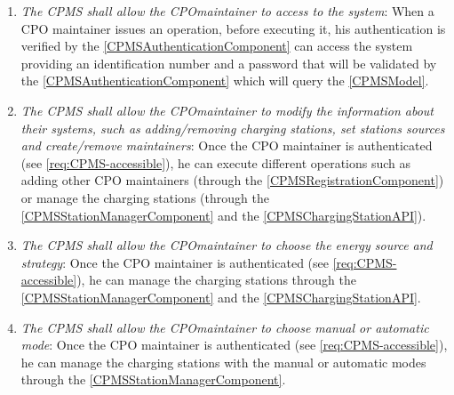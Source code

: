 \begin{enumerate}[label=\textbf{R\arabic*}]
    \label{req:CPMS-reachable}
    \item \textit{The \ac{CPMS} shall allow the \ac{CPO}maintainer to access to the system}:
    When a \ac{CPO} maintainer issues an operation, before executing it, his authentication is verified by the \ref{CPMSAuthenticationComponent} can access the system providing an identification number and a password that will be validated by the \ref{CPMSAuthenticationComponent} which will query the \ref{CPMSModel}.
    \label{req:CPMS-accessible}
    \item \textit{The \ac{CPMS} shall allow the \ac{CPO}maintainer to modify the information about their systems, such as adding/removing charging stations, set stations sources and create/remove maintainers}:
    Once the \ac{CPO} maintainer is authenticated (see \ref{req:CPMS-accessible}), he can execute different operations such as adding other \ac{CPO} maintainers (through the \ref{CPMSRegistrationComponent}) or manage the charging stations (through the \ref{CPMSStationManagerComponent} and the \ref{CPMSChargingStationAPI}).
    \label{req:CPMS-modify-cpo-infos}
    \item \textit{The \ac{CPMS} shall allow the \ac{CPO}maintainer to choose the energy source and strategy}:
    Once the \ac{CPO} maintainer is authenticated (see \ref{req:CPMS-accessible}), he can manage the charging stations through the \ref{CPMSStationManagerComponent} and the \ref{CPMSChargingStationAPI}.
    \label{req:CPMS-select-source-strategy}
    \item \textit{The \ac{CPMS} shall allow the \ac{CPO}maintainer to choose manual or automatic mode}:
    Once the \ac{CPO} maintainer is authenticated (see \ref{req:CPMS-accessible}), he can manage the charging stations with the manual or automatic modes through the \ref{CPMSStationManagerComponent}.
    \label{req:CPMS-select-mode}
\end{enumerate}
\clearpage